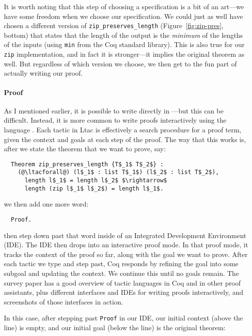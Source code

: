 It is worth noting that this step of choosing a specification is a bit of an art---we have some freedom when we choose our specification.
We could just as well have chosen a different version of \lstinline{zip_preserves_length} (Figure~\ref{fig:zip-pres}, bottom)
that states that the length of the output is the \textit{minimum} of the lengths of the inputs (using \lstinline{min} from the Coq standard library).
This is also true for our \lstinline{zip} implementation, and in fact it is stronger---it implies the original theorem as well.
But regardless of which version we choose, we then get to the fun part of actually writing our proof.

\paragraph{Proof} As I mentioned earlier, it is possible to write  directly in ---but this can be difficult.
Instead, it is more common to write proofs interactively using the  language .
Each tactic in Ltac is effectively a search procedure for a proof term, given the context and goals at each step of the proof.
The way that this works is, after we state the theorem that we want to prove, say:

\begin{lstlisting}
  Theorem zip_preserves_length {T$_1$ T$_2$} :
    (@\ltacforall@) (l$_1$ : list T$_1$) (l$_2$ : list T$_2$),
      length l$_1$ = length l$_2$ $\rightarrow$
      length (zip l$_1$ l$_2$) = length l$_1$.
\end{lstlisting}
we then add one more word:

\begin{lstlisting}
  Proof.
\end{lstlisting}
then step down past that word inside of an Integrated Development Environment (IDE). %
The IDE then drops into an interactive proof mode.
In that proof mode, it tracks the context of the proof so far, along with the goal we want to prove.
After each tactic we type and step past, Coq responds by refining the goal into some subgoal
and updating the context.
We continue this until no goals remain.
The  survey paper has a good overview of tactic languages in Coq and in other proof assistants,
plus different interfaces and IDEs for writing proofs interactively, and screenshots of those interfaces in action.

In this case, after stepping past \lstinline{Proof} in our IDE, 
our initial context (above the line) is empty, and our initial goal (below the line) is the original theorem:


